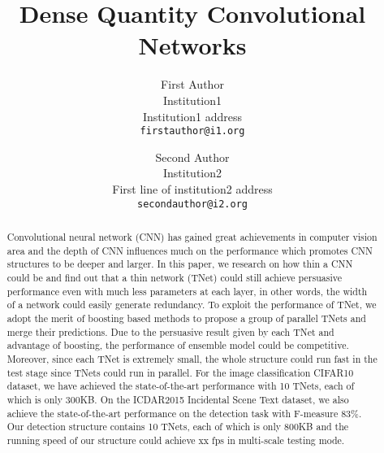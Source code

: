 \documentclass[10pt,twocolumn,letterpaper]{article}
\begin{document}
\title{Dense Quantity Convolutional Networks}

\author{First Author\\
Institution1\\
Institution1 address\\
{\tt\small firstauthor@i1.org}
\and
Second Author\\
Institution2\\
First line of institution2 address\\
{\tt\small secondauthor@i2.org}
}

\maketitle

\begin{abstract}
	Convolutional neural network (CNN) has gained great achievements in computer vision area and the depth of CNN influences much on the performance which promotes CNN structures to be deeper and larger. 
	In this paper, we research on how thin a CNN could be and find out that a thin network (TNet) could still achieve persuasive performance even with much less parameters at each layer, in other words, the width of a network could easily generate redundancy. To exploit the performance of TNet, we adopt the merit of boosting based methods to propose a group of parallel TNets and merge their predictions.
	Due to the persuasive result given by each TNet and advantage of boosting, the performance of ensemble model could be competitive. Moreover, since each TNet is extremely small, the whole structure could run fast in the test stage since TNets could run in parallel. For the image classification CIFAR10 dataset, we have achieved the state-of-the-art performance with 10 TNets, each of which is only 300KB. On the ICDAR2015 Incidental Scene Text dataset, we also achieve the state-of-the-art performance on the detection task with F-measure 83\%. Our detection structure contains 10 TNets, each of which is only 800KB and the running speed of our structure could achieve xx fps in multi-scale testing mode.
	
\end{abstract}
\end{document}
